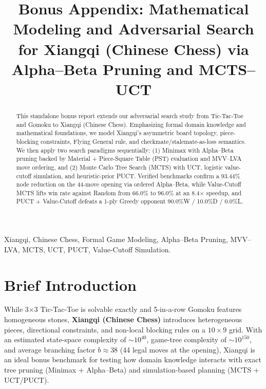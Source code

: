 \documentclass[conference]{IEEEtran}
\begin{document}
\title{Bonus Appendix: Mathematical Modeling and Adversarial Search\\
for Xiangqi (Chinese Chess) via Alpha--Beta Pruning and MCTS--UCT}

\author{
}

\maketitle

\begin{abstract}
This standalone bonus report extends our adversarial search study from Tic-Tac-Toe and Gomoku to Xiangqi (Chinese Chess). Emphasizing formal domain knowledge and mathematical foundations, we model Xiangqi's asymmetric board topology, piece-blocking constraints, Flying General rule, and checkmate/stalemate-as-loss semantics. We then apply two search paradigms sequentially: (1) Minimax with Alpha--Beta pruning backed by Material + Piece-Square Table (PST) evaluation and MVV--LVA move ordering, and (2) Monte Carlo Tree Search (MCTS) with UCT, logistic value-cutoff simulation, and heuristic-prior PUCT. Verified benchmarks confirm a 93.44\% node reduction on the 44-move opening via ordered Alpha--Beta, while Value-Cutoff MCTS lifts win rate against Random from 66.0\% to 96.0\% at an 8.4$\times$ speedup, and PUCT + Value-Cutoff defeats a 1-ply Greedy opponent 90.0\%W / 10.0\%D / 0.0\%L.
\end{abstract}

\begin{IEEEkeywords}
Xiangqi, Chinese Chess, Formal Game Modeling, Alpha--Beta Pruning, MVV--LVA, MCTS, UCT, PUCT, Value-Cutoff Simulation.
\end{IEEEkeywords}

\section{Brief Introduction}
While 3$\times$3 Tic-Tac-Toe is solvable exactly and 5-in-a-row Gomoku features homogeneous stones, \textbf{Xiangqi (Chinese Chess)} introduces heterogeneous pieces, directional constraints, and non-local blocking rules on a $10 \times 9$ grid. With an estimated state-space complexity of $\sim 10^{40}$, game-tree complexity of $\sim 10^{150}$, and average branching factor $b \approx 38$ (44 legal moves at the opening), Xiangqi is an ideal bonus benchmark for testing how domain knowledge interacts with exact tree pruning (Minimax + Alpha--Beta) and simulation-based planning (MCTS + UCT/PUCT).
\end{document}
